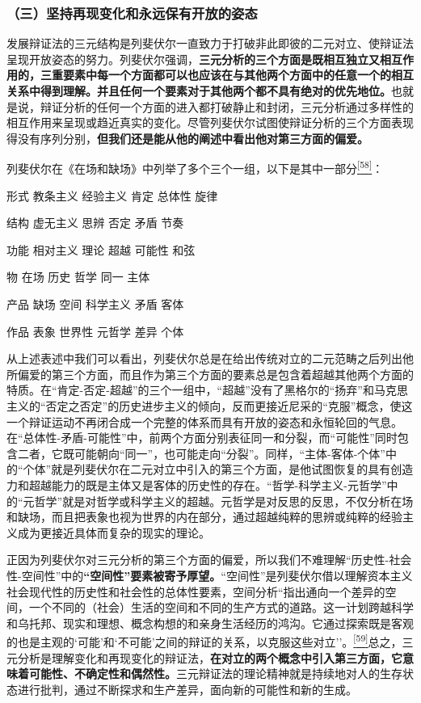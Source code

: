 \documentclass[UTF8, fontset = sourcesans, a4paper, oneside, zihao =
-4, scheme=chinese, no-math, space=true]{ctexbook}
\begin{document}
\subsubsection{（三）坚持再现变化和永远保有开放的姿态}\label{part0005_split_003.htmlux5cux23d007}

发展辩证法的三元结构是列斐伏尔一直致力于打破非此即彼的二元对立、使辩证法呈现开放姿态的努力。列斐伏尔强调，\textbf{三元分析的三个方面是既相互独立又相互作用的，三重要素中每一个方面都可以也应该在与其他两个方面中的任意一个的相互关系中得到理解。并且任何一个要素对于其他两个都不具有绝对的优先地位。}也就是说，辩证分析的任何一个方面的进入都打破静止和封闭，三元分析通过多样性的相互作用来呈现或趋近真实的变化。尽管列斐伏尔试图使辩证分析的三个方面表现得没有序列分别，\textbf{但我们还是能从他的阐述中看出他对第三方面的偏爱。}

列斐伏尔在《在场和缺场》中列举了多个三个一组，以下是其中一部分\protect\hypertarget{part0005_split_003.htmlux5cux23w58}{}{}\protect\hyperlink{part0005_split_003.htmlux5cux23m58}{\textsuperscript{{[}58{]}}}：

形式 教条主义 经验主义 肯定 总体性 旋律

结构 虚无主义 思辨 否定 矛盾 节奏

功能 相对主义 理论 超越 可能性 和弦

物 在场 历史 哲学 同一 主体

产品 缺场 空间 科学主义 矛盾 客体

作品 表象 世界性 元哲学 差异 个体

从上述表述中我们可以看出，列斐伏尔总是在给出传统对立的二元范畴之后列出他所偏爱的第三个方面，而且作为第三个方面的要素总是包含着超越其他两个方面的特质。在``肯定-否定-超越''的三个一组中，``超越''没有了黑格尔的``扬弃''和马克思主义的``否定之否定''的历史进步主义的倾向，反而更接近尼采的``克服''概念，使这一个辩证运动不再闭合成一个完整的体系而具有开放的姿态和永恒轮回的气息。在``总体性-矛盾-可能性''中，前两个方面分别表征同一和分裂，而``可能性''同时包含二者，它既可能朝向``同一''，也可能走向``分裂''。同样，``主体-客体-个体''中的``个体''就是列斐伏尔在二元对立中引入的第三个方面，是他试图恢复的具有创造力和超越能力的既是主体又是客体的历史性的存在。``哲学-科学主义-元哲学''中的``元哲学''就是对哲学或科学主义的超越。元哲学是对反思的反思，不仅分析在场和缺场，而且把表象也视为世界的内在部分，通过超越纯粹的思辨或纯粹的经验主义成为更接近具体而复杂的现实的理论。

正因为列斐伏尔对三元分析的第三个方面的偏爱，所以我们不难理解``历史性-社会性-空间性''中的\textbf{``空间性''要素被寄予厚望。}``空间性''是列斐伏尔借以理解资本主义社会现代性的历史性和社会性的总体性要素，空间分析``指出通向一个差异的空间，一个不同的（社会）生活的空间和不同的生产方式的道路。这一计划跨越科学和乌托邦、现实和理想、概念构想的和亲身生活经历的鸿沟。它通过探索既是客观的也是主观的`可能'和`不可能'之间的辩证的关系，以克服这些对立''。\protect\hypertarget{part0005_split_003.htmlux5cux23w59}{}{}\protect\hyperlink{part0005_split_003.htmlux5cux23m59}{\textsuperscript{{[}59{]}}}总之，三元分析是理解变化和再现变化的辩证法，\textbf{在对立的两个概念中引入第三方面，它意味着可能性、不确定性和偶然性。}三元辩证法的理论精神就是持续地对人的生存状态进行批判，通过不断探求和生产差异，面向新的可能性和新的生成。
\end{document}
